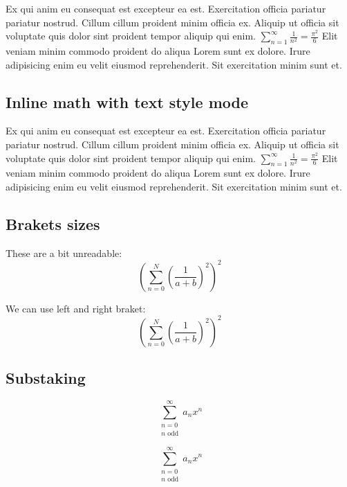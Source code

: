 \documentclass[12pt]{article}
\begin{document}
Ex qui anim eu consequat est excepteur ea est. Exercitation officia pariatur pariatur nostrud. Cillum cillum proident minim officia ex. Aliquip ut officia sit voluptate quis dolor sint proident tempor aliquip qui enim. $ \displaystyle \sum_{n=1}^\infty \frac{1}{n^2} = \frac{\pi^2}{6} $ Elit veniam minim commodo proident do aliqua Lorem sunt ex dolore. Irure adipisicing enim eu velit eiusmod reprehenderit. Sit exercitation minim sunt et.

\subsection{Inline math with text style mode}

Ex qui anim eu consequat est excepteur ea est. Exercitation officia pariatur pariatur nostrud. Cillum cillum proident minim officia ex. Aliquip ut officia sit voluptate quis dolor sint proident tempor aliquip qui enim. $ \textstyle \sum_{n=1}^\infty \frac{1}{n^2} = \frac{\pi^2}{6} $ Elit veniam minim commodo proident do aliqua Lorem sunt ex dolore. Irure adipisicing enim eu velit eiusmod reprehenderit. Sit exercitation minim sunt et.

\subsection{Brakets sizes}

These are a bit unreadable:
\begin{equation*}
    ( \sum_{n=0}^N ( \frac{1}{a + b} )^2 )^2
\end{equation*}

\noindent We can use left and right braket:
\begin{equation*}
    \left( \sum_{n=0}^N \left( \frac{1}{a + b} \right)^2 \right)^2
\end{equation*}

\subsection{Substaking}

\begin{equation*}
    \sum_{\substack{n=0 \\ n \text{ odd}}}^\infty a_{n} x^n
\end{equation*}

\begin{equation*}
    \textstyle
    \sum_{\substack{n=0 \\ n \text{ odd}}}^\infty a_{n} x^n
\end{equation*}
\end{document}
